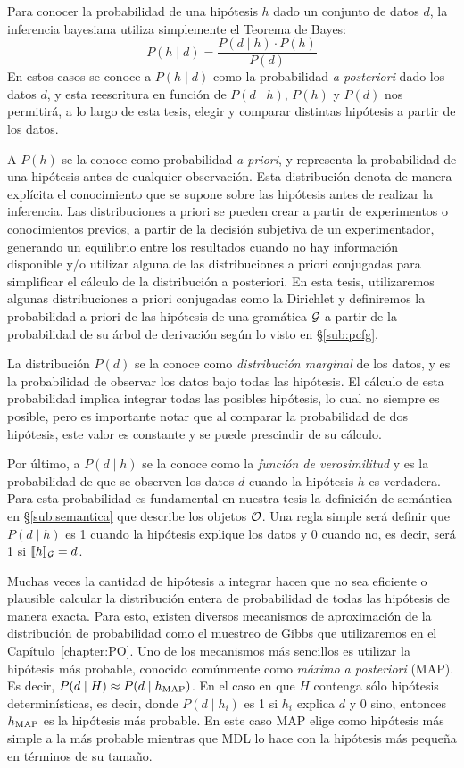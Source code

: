 Para conocer la probabilidad de una hipótesis $h$ dado un conjunto de datos $d$, la inferencia bayesiana utiliza simplemente el Teorema de Bayes:
$$
P(h\mid d) = \frac{P(d\mid h) \cdot P(h)}{P(d)}
$$
En estos casos se conoce a $P(h\mid d)$ como la probabilidad {\em a posteriori} dado los datos $d$, y esta reescritura en función de $P(d\mid h)$, $P(h)$ y $P(d)$ nos permitirá, a lo largo de esta tesis, elegir y comparar distintas hipótesis a partir de los datos.

A $P(h)$ se la conoce como probabilidad {\em a priori}, y representa la probabilidad de una hipótesis antes de cualquier observación. Esta distribución denota de manera explícita el conocimiento que se supone sobre las hipótesis antes de realizar la inferencia. Las distribuciones a priori se pueden crear a partir de experimentos o conocimientos previos, a partir de la decisión subjetiva de un experimentador, generando un equilibrio entre los resultados cuando no hay información disponible y/o utilizar alguna de las distribuciones a priori conjugadas para simplificar el cálculo de la distribución a posteriori. En esta tesis, utilizaremos algunas distribuciones a priori conjugadas como la Dirichlet y definiremos la probabilidad a priori de las hipótesis de una gramática $\gram$ a partir de la probabilidad de su árbol de derivación según lo visto en \S\ref{sub:pcfg}.

La distribución $P(d)$ se la conoce como {\em distribución marginal} de los datos, y es la probabilidad de observar los datos bajo todas las hipótesis. El cálculo de esta probabilidad implica integrar todas las posibles hipótesis, lo cual no siempre es posible, pero es importante notar que al comparar la probabilidad de dos hipótesis, este valor es constante y se puede prescindir de su cálculo. 

Por último, a $P(d\mid h)$ se la conoce como la {\em función de verosimilitud} y es la probabilidad de que se observen los datos $d$ cuando la hipótesis $h$ es verdadera. Para esta probabilidad es fundamental en nuestra tesis la definición de semántica en \S\ref{sub:semantica} que describe los objetos $\+O$. Una regla simple será definir que $P(d\mid h)$ es 1 cuando la hipótesis explique los datos y 0 cuando no, es decir, será 1 si $\sem{h}_\gram = d$.

Muchas veces la cantidad de hipótesis a integrar hacen que no sea eficiente o plausible calcular la distribución entera de probabilidad de todas las hipótesis de manera exacta. Para esto, existen diversos mecanismos de aproximación de la distribución de probabilidad como el muestreo de Gibbs que utilizaremos en el Capítulo~\ref{chapter:PO}. Uno de los mecanismos más sencillos es utilizar la hipótesis más probable, conocido comúnmente como {\em máximo a posteriori} (MAP). Es decir, $P(d\mid H) \approx P(d\mid h_{\rm MAP})$. En el caso en que $H$ contenga sólo hipótesis determinísticas, es decir, donde $P(d\mid h_i)$ es 1 si $h_i$ explica $d$ y $0$ sino, entonces $h_{\rm MAP}$ es la hipótesis más probable. En este caso MAP elige como hipótesis más simple a la más probable mientras que MDL lo hace con la hipótesis más pequeña en términos de su tamaño.


